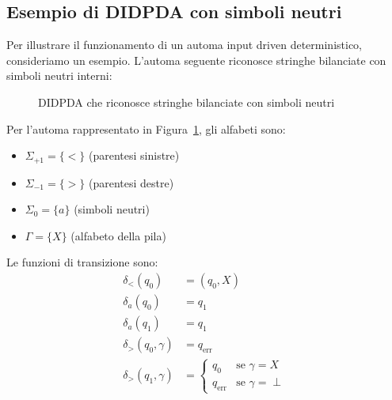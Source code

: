 \documentclass[a4paper,12pt]{report}
\theoremstyle{propositionstyle}
\begin{document}
    \clearpage
    \subsection{Esempio di DIDPDA con simboli neutri}
    
    Per illustrare il funzionamento di un automa input driven deterministico, consideriamo un esempio.
    L'automa seguente riconosce stringhe bilanciate con simboli neutri interni:
    
    \begin{figure}[H]
        \centering
        \caption{DIDPDA che riconosce stringhe bilanciate con simboli neutri}
        \label{fig:esempio_didpda}
    \end{figure}

    Per l'automa rappresentato in Figura~\ref{fig:esempio_didpda}, gli alfabeti sono:
    \begin{itemize}
        \item $\Sigma_{+1} = \{<\}$ (parentesi sinistre)
        \item $\Sigma_{-1} = \{>\}$ (parentesi destre)
        \item $\Sigma_0 = \{a\}$ (simboli neutri)
        \item $\Gamma = \{X\}$ (alfabeto della pila)
    \end{itemize}
    
    Le funzioni di transizione sono:
    \begin{align}
        \delta_{<}(q_0) &= (q_0, X) \\
        \delta_{a}(q_0) &= q_1 \\
        \delta_{a}(q_1) &= q_1 \\
        \delta_{>}(q_0, \gamma) &= q_{\text{err}} \\
        \delta_{>}(q_1, \gamma) &= \begin{cases}
            q_0 & \text{se } \gamma = X \\
            q_{\text{err}} & \text{se } \gamma = \perp
        \end{cases}
    \end{align}
    
\end{document}
